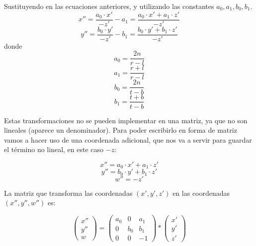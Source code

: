 \documentclass[a4paper,11pt, oneside]{book}
\begin{document}
Sustituyendo en las ecuaciones anteriores, y utilizando las constantes $a_0,a_1, b_0, b_1$.
\begin{equation}
x'' = \frac{a_0 \cdot x'}{-z'} -a_1 = \frac{a_0 \cdot x'+a_1 \cdot z'}{-z'}
\end{equation}
\begin{equation}
y'' = \frac{b_0 \cdot y'}{-z'} -b_1 = \frac{b_0 \cdot y'+b_1 \cdot z'}{-z'}
\end{equation}
donde
\begin{equation}
a_0 = \frac{2n}{r-l}
\end{equation}
\begin{equation}
a_1 = \frac{r+l}{r-l}
\end{equation}
\begin{equation}
b_0 = \frac{2n}{t-b}
\end{equation}
\begin{equation}
b_1 = \frac{t+b}{t-b}
\end{equation}

Estas transformaciones no se pueden implementar en una matriz, ya que no son lineales (aparece un denominador). Para poder escribirlo en forma de matriz vamos a hacer uso de una coordenada adicional, que nos va a servir para guardar el término no lineal, en este caso $-z$:

\begin{equation}
x'' = a_0 \cdot x'+a_1 \cdot z'
\end{equation}
\begin{equation}
y'' = b_0 \cdot y'+b_1 \cdot z'
\end{equation}
\begin{equation}
w'' = -z'
\end{equation}

La matriz que transforma las coordenadas $(x',y',z')$ en las coordenadas $(x'',y'',w'')$ es:

$$\begin{pmatrix}
x''\\
y''\\
w
\end{pmatrix}=
\begin{pmatrix}
	a_0 & 0&a_1\\
	0&b_0&b_1\\
	0&0&-1
\end{pmatrix}*
\begin{pmatrix}
x'\\
y'\\
z'
\end{pmatrix}
$$
\end{document}
